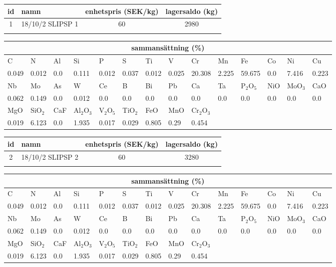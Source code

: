 \begin{center}
{\scriptsize\addtolength{\tabcolsep}{-3pt}
\begin{tabular}{clcc}
id&namn&enhetspris (SEK/kg)&lagersaldo (kg)\\
\hline
1&18/10/2 SLIPSP 1&60&2980\\\\
\end{tabular}
\begin{tabular}{llllllllllllll}
\multicolumn{14}{c}{sammansättning (\%)}\\
\hline
C&N&Al&Si&P&S&Ti&V&Cr&Mn&Fe&Co&Ni&Cu\\
\hline
0.049&0.012&0.0&0.111& 0.012&0.037&0.012&0.025& 20.308&2.225&59.675&0.0& 7.416&0.223\\
\hline
Nb&Mo&As&W&Ce&B&Bi&Pb&Ca&Ta&P$_2$O$_5$&NiO&MoO$_3$&CaO\\
\hline
0.062& 0.149& 0.0& 0.012& 0.0& 0.0& 0.0& 0.0& 0.0& 0.0& 0.0& 0.0& 0.0& 0.0\\
\hline
MgO&SiO$_2$&CaF&Al$_2$O$_3$&V$_2$O$_5$&TiO$_2$&FeO&MnO&Cr$_2$O$_3$\\
\hline
0.019& 6.123& 0.0& 1.935& 0.017& 0.029& 0.805& 0.29& 0.454\\
\end{tabular}
}
\end{center}

\begin{center}
{\scriptsize\addtolength{\tabcolsep}{-3pt}
\begin{tabular}{clcc}
id&namn&enhetspris (SEK/kg)&lagersaldo (kg)\\
\hline
2&18/10/2 SLIPSP 2&60&3280\\\\
\end{tabular}
\begin{tabular}{llllllllllllll}
\multicolumn{14}{c}{sammansättning (\%)}\\
\hline
C&N&Al&Si&P&S&Ti&V&Cr&Mn&Fe&Co&Ni&Cu\\
\hline
0.049&0.012&0.0&0.111& 0.012&0.037&0.012&0.025& 20.308&2.225&59.675&0.0& 7.416&0.223\\
\hline
Nb&Mo&As&W&Ce&B&Bi&Pb&Ca&Ta&P$_2$O$_5$&NiO&MoO$_3$&CaO\\
\hline
0.062& 0.149& 0.0& 0.012& 0.0& 0.0& 0.0& 0.0& 0.0& 0.0& 0.0& 0.0& 0.0& 0.0\\
\hline
MgO&SiO$_2$&CaF&Al$_2$O$_3$&V$_2$O$_5$&TiO$_2$&FeO&MnO&Cr$_2$O$_3$\\
\hline
0.019& 6.123& 0.0& 1.935& 0.017& 0.029& 0.805& 0.29& 0.454\\
\end{tabular}
}
\end{center}


